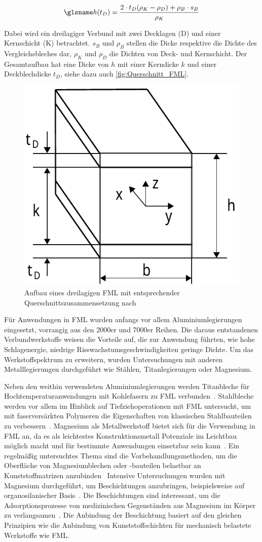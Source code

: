 \begin{equation}
    \s{h}(t_D) = \frac{2 \cdot t_D (\rho_K - \rho_D) + \rho_B \cdot s_B}{\rho_K}
    \label{eq:Dicke_FML}
\end{equation}

Dabei wird ein dreilagiger Verbund mit zwei Decklagen (D) und einer Kernschicht (K) betrachtet. $s_B$ und $\rho_B$ stellen die Dicke respektive die Dichte des Vergleichsbleches dar, $\rho_K$ und $\rho_D$ die Dichten von Deck- und Kernschicht.
Der Gesamtaufbau hat eine Dicke von $h$ mit einer Kerndicke $k$ und einer Deckblechdicke $t_D$, siehe dazu auch \autoref{fig:Querschnitt_FML}.

\begin{figure}[H]%
    \centering
    \includegraphics[width=0.3\linewidth]{Bilder/SdT/Aufbau_Dichte_FML}
    \caption[Aufbau eines dreilagigen FML]{Aufbau eines dreilagigen FML mit entsprechender Querschnittszusammensetzung nach \cite{Wollmann.2018}}
    \label{fig:Querschnitt_FML}
\end{figure}

Für Anwendungen in FML wurden anfangs vor allem Aluminiumlegierungen eingesetzt, vorrangig aus den 2000er und 7000er Reihen.
Die daraus entstandenen Verbundwerkstoffe weisen die Vorteile auf, die zur Anwendung führten, wie hohe Schlagenergie, niedrige Risswachstumsgeschwindigkeiten geringe Dichte.
Um das Werkstoffspektrum zu erweitern, wurden Untersuchungen mit anderen Metalllegierungen durchgeführt wie Stählen, Titanlegierungen oder Magnesium.

Neben den weithin verwendeten Aluminiumlegierungen werden Titanbleche für Hochtemperaturanwendungen mit Kohlefasern zu FML verbunden~\cite{BurianekDennisSpearing.2003,Hu.2020}.
Stahlbleche werden vor allem im Hinblick auf Tiefziehoperationen mit FML untersucht, um mit faserversärkten Polymeren die Eigenschaften von klassischen Stahlbauteilen zu verbessern~\cite{Behrens.2014,Behrens.2017,Blala.2021,Hahn.2018}.
Magnesium als Metallwerkstoff bietet sich für die Verwendung in FML an, da es als leichtestes Konstruktionsmetall Potenziale im Leichtbau möglich macht und für bestimmte Anwendungen einsetzbar sein kann~\cite{Cortes.2005,Alderliesten.2008}.
Ein regelmäßig untersuchtes Thema sind die Vorbehandlungsmethoden, um die Oberfläche von Magnesiumblechen oder -bauteilen belastbar an Kunststoffmatrizen anzubinden~\cite{Cicco.2019,Cicco.2019b}
Intensive Untersuchungen wurden mit Magnesium durchgeführt, um Beschichtungen anzubringen, beispielsweise auf organosilanischer Basis~\cite{Hausbeck.2012}.
Die Beschichtungen sind interessant, um die Adsorptionsprozesse von medizinischen Gegenständen aus Magnesium im Körper zu verlangsamen~\cite{Galvin.2013,Zucchi.2006}.
Die Anbindung der Beschichtung basiert auf den gleichen Prinzipien wie die Anbindung von Kunststoffschichten für mechanisch belastete Werkstoffe wie FML\@.

